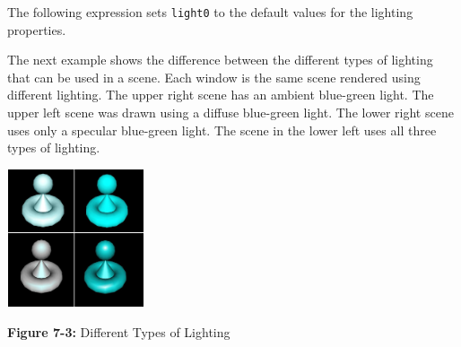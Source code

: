 
\noindent
The following expression sets \texttt{light0} to the default values for
the lighting properties.


The next example shows the difference between the different types of
lighting that can be used in a scene. Each window is the same scene
rendered using different lighting. The upper right scene has an ambient
blue-green light. The upper left scene was drawn using a diffuse
blue-green light. The lower right scene uses only a specular blue-green
light. The scene in the lower left uses all three types of lighting.

\begin{center}
{\includegraphics[width=1.6in,height=1.6in]{ub-img/ub-img33.jpg}}

{\sffamily\bfseries Figure 7-3:}
{\sffamily Different Types of Lighting}
\end{center}

